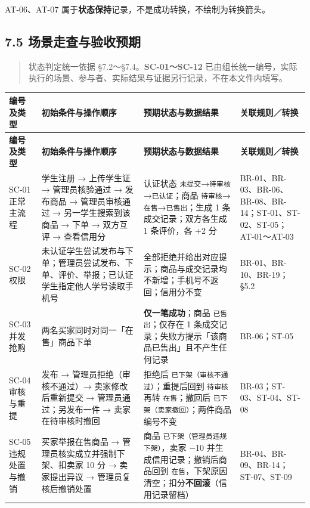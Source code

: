\documentclass[12pt,a4paper]{ctexart}
\begin{document}
AT-06、AT-07 属于\textbf{状态保持}记录，不是成功转换，不绘制为转换箭头。



\subsection*{7.5 场景走查与验收预期}

\begin{quote}\small
状态判定统一依据 §7.2～§7.4。\textbf{SC-01～SC-12} 已由组长统一编号，实际执行的场景、参与者、实际结果与证据另行记录，不在本文件内填写。

\end{quote}

{\scriptsize
\begin{longtable}{|p{1.50cm}|p{6.26cm}|p{6.02cm}|p{2.22cm}|}
\hline
\textbf{编号及类型} & \textbf{初始条件与操作顺序} & \textbf{预期状态与数据结果} & \textbf{关联规则／转换} \\
\hline
\endfirsthead
\hline
\textbf{编号及类型} & \textbf{初始条件与操作顺序} & \textbf{预期状态与数据结果} & \textbf{关联规则／转换} \\
\hline
\endhead
\hline
\endfoot
SC-01 正常主流程 & 学生注册 → 上传学生证 → 管理员核验通过 → 发布商品 → 管理员审核通过 → 另一学生搜索到该商品 → 下单 → 双方互评 → 查看信用分 & 认证状态 \texttt{未提交}→\texttt{待审核}→\texttt{已认证}；商品 \texttt{待审核}→\texttt{在售}→\texttt{已售出}；生成 1 条成交记录；双方各生成 1 条评价，各 +2 分 & BR-01、BR-03、BR-06、BR-08、BR-14；ST-01、ST-02、ST-05；AT-01～AT-03 \\
\hline
SC-02 权限 & 未认证学生尝试发布与下单；管理员尝试发布、下单、评价、举报；已认证学生指定他人学号读取手机号 & 全部拒绝并给出对应提示；商品与成交记录均不新增；手机号不返回；信用分不变 & BR-01、BR-10、BR-19；§5.2 \\
\hline
SC-03 并发抢购 & 两名买家同时对同一「在售」商品下单 & \textbf{仅一笔成功}；商品 \texttt{已售出}；仅存在 1 条成交记录；失败方提示「该商品已售出」且不产生任何记录 & BR-06；ST-05 \\
\hline
SC-04 审核与重提 & 发布 → 管理员拒绝（审核不通过）→ 卖家修改后重新提交 → 管理员通过；另发布一件 → 卖家在待审核时撤回 & 拒绝后 \texttt{已下架（审核不通过）}；重提后回到 \texttt{待审核} 再转 \texttt{在售}；撤回后 \texttt{已下架（卖家撤回）}；两件商品编号不变 & BR-03；ST-03、ST-04、ST-08 \\
\hline
SC-05 违规处置与撤销 & 买家举报在售商品 → 管理员核实成立并强制下架、扣卖家 10 分 → 卖家提出异议 → 管理员复核后撤销处置 & 商品 \texttt{已下架（管理员违规下架）}，卖家 −10 并生成信用记录；撤销后商品回到 \texttt{在售}，下架原因清空；扣分\textbf{不回滚}（信用记录留档） & BR-04、BR-09、BR-14；ST-07、ST-09 \\

\end{longtable}}
\end{document}
